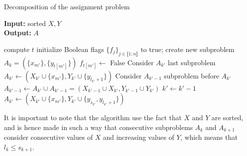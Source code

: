 \documentclass[a4paper,12pt]{article}
\begin{document}
\begin{algorithm}
\caption{Decomposition of the assignment problem}\label{subproblem}
\hspace*{\algorithmicindent} \textbf{Input:} sorted $X,Y$\\
\hspace*{\algorithmicindent} \textbf{Output:} $A$ 
\begin{algorithmic}[1]
\State compute $t$
\State initialize Boolean flags $\{f_j\}_{j \in \llbracket 1;n \rrbracket}$ to true;
	 
		\State create new subproblem $A_k = (\{x_{m'}\},\{y_{t[m']}\})$	
		\State $f_{t[m']} \gets $ False
    \Else
        \State Consider $A_{k'}$ last subproblem
         
        	\State $A_{k'} \gets (X_{k'} \cup \{x_{m'}\}, Y_{k'} \cup \{y_{l_{k'}+1}\})$
        \Else {}
        	 
        		\State Consider $A_{k'-1}$ subproblem before $A_{k'}$
        		\State $A_{k'-1} \gets A_{k'} \cup A_{k'-1} = (X_{k'-1} \cup X_{k'},Y_{k'-1} \cup Y_{k'})$
        		\State $k' \gets k'-1$ 
        	\EndWhile
        	\State $A_{k'} \gets (X_{k'} \cup \{x_{m'}\},Y_{k'} \cup \{y_{s_{k'}},y_{l_{k'}+1}\})$
        \EndIf
    \EndIf
\EndFor
\State {}
\end{algorithmic}
\end{algorithm}

It is important to note that the algorithm use the fact that $X$ and $Y$ are sorted, and is hence made in such a way that consecutive subproblems $A_k$ and $A_{k+1}$ consider consecutive values of $X$ and increasing values of $Y$, which means that $l_k \leqslant s_{k+1}$.
\end{document}
